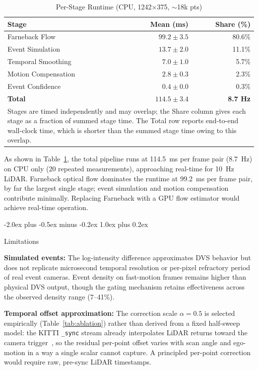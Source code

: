 \documentclass[conference]{IEEEtran}
\makeatletter
\def\section{\@startsection{section}{1}{\z@}
  {-2.0ex plus -0.5ex minus -0.2ex}
  {1.0ex plus 0.2ex}
  {\normalfont\large\bfseries\raggedright}}
\makeatother
\begin{document}
\begin{table}[!h]
\centering
\small
\caption{Per-Stage Runtime (CPU, 1242$\times$375, ${\sim}$18k pts)}
\label{tab:runtime}
\setlength{\tabcolsep}{3pt}
\begin{tabular}{lrr}
\toprule
Stage & Mean (ms) & Share (\%) \\
\midrule
Farneback Flow      & $99.2 \pm 3.5$ & 80.6\% \\
Event Simulation    & $13.7 \pm 2.0$ & 11.1\% \\
Temporal Smoothing  & $ 7.0 \pm 1.0$ &  5.7\% \\
Motion Compensation & $ 2.8 \pm 0.3$ &  2.3\% \\
Event Confidence    & $ 0.4 \pm 0.0$ &  0.3\% \\
\midrule
\textbf{Total}      & $\mathbf{114.5 \pm 3.4}$ & \textbf{8.7 Hz} \\
\bottomrule
\multicolumn{3}{p{0.92\columnwidth}}{\footnotesize Stages are
  timed independently and may overlap; the Share column gives
  each stage as a fraction of summed stage time. The Total row
  reports end-to-end wall-clock time, which is shorter than the
  summed stage time owing to this overlap.} \\
\end{tabular}
\end{table}

As shown in Table~\ref{tab:runtime}, the total pipeline runs at
114.5~ms per frame pair (8.7~Hz) on CPU only (20 repeated
measurements), approaching real-time for 10~Hz LiDAR. Farneback
optical flow dominates the runtime at 99.2~ms per frame pair, by
far the largest single stage; event simulation and motion
compensation contribute minimally. Replacing Farneback with a
GPU flow estimator would achieve real-time operation.

\section{Limitations}

\textbf{Simulated events:} The log-intensity difference
approximates DVS behavior but does not replicate microsecond
temporal resolution or per-pixel refractory period of real
event cameras. Event density on fast-motion frames remains
higher than physical DVS output, though the gating mechanism
retains effectiveness across the observed density range
(7--41\%).

\textbf{Temporal offset approximation:} The correction scale
$\alpha{=}0.5$ is selected empirically (Table~\ref{tab:ablation})
rather than derived from a fixed half-sweep model: the KITTI
\texttt{\_sync} stream already interpolates LiDAR returns toward
the camera trigger~\cite{kitti}, so the residual per-point offset
varies with scan angle and ego-motion in a way a single scalar
cannot capture. A principled per-point correction would require
raw, pre-sync LiDAR timestamps.
\end{document}
